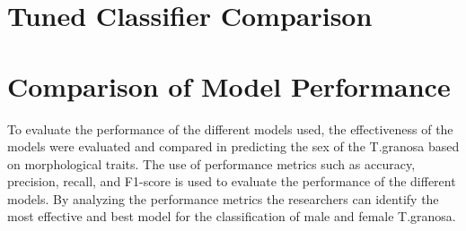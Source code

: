 \section{Tuned Classifier Comparison}

\begin{table}[H]
	\centering
	\caption{Tuned Classifier Comparison}
	\label{tab:tuned-classifier-comparison}
\end{table}



\section{Comparison of Model Performance}

To evaluate the performance of the different models used, the effectiveness of the models were evaluated and compared in predicting the sex of the T.granosa based on morphological traits. The use of performance metrics such as accuracy, precision, recall, and F1-score is used to evaluate the performance of the different models. By analyzing the performance metrics the researchers can identify the most effective and best model for the classification of male and female T.granosa. 


\begin{table}[H]
	\centering
	\caption{Model Performance Comparison}
	\label{tab:model-performance}
\end{table}

